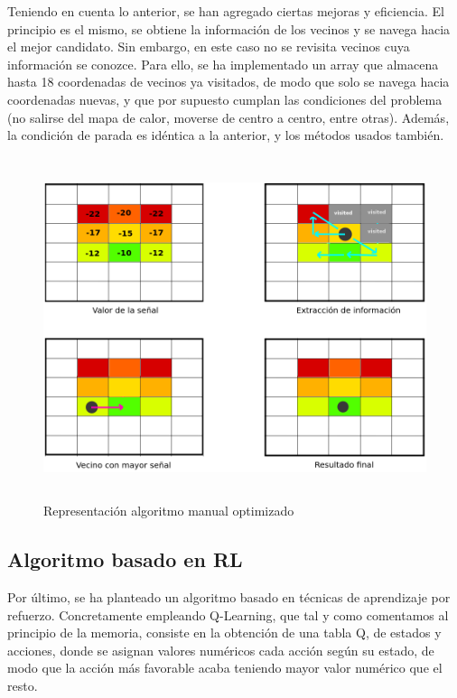 Teniendo en cuenta lo anterior, se han agregado ciertas mejoras y eficiencia. El principio es el mismo, se obtiene la información de los vecinos y se navega hacia el mejor candidato. Sin embargo, en este caso no se revisita vecinos cuya información se conozce. Para ello, se ha implementado un array que almacena hasta 18 coordenadas de vecinos ya visitados, de modo que solo se navega hacia coordenadas nuevas, y que por supuesto cumplan las condiciones del problema (no salirse del mapa de calor, moverse de centro a centro, entre otras). Además, la condición de parada es idéntica a la anterior, y los métodos usados también.\\

\begin{figure} [H]
    \begin{center}
    \includegraphics[height=10cm]{imagenes/cap4/10_algoritmo_optimizado.png}
    \end{center}
    \caption[Representación algoritmo manual optimizado]{Representación algoritmo manual optimizado}
    \label{fig:opt_algorithm}
\end{figure}

\subsection{Algoritmo basado en \ac{RL}}
\label{subsec:alg-q}

Por último, se ha planteado un algoritmo basado en técnicas de aprendizaje por refuerzo. Concretamente empleando Q-Learning, que tal y como comentamos al principio de la memoria, consiste en la obtención de una tabla Q, de estados y acciones, donde se asignan valores numéricos cada acción según su estado, de modo que la acción más favorable acaba teniendo mayor valor numérico que el resto.\\

